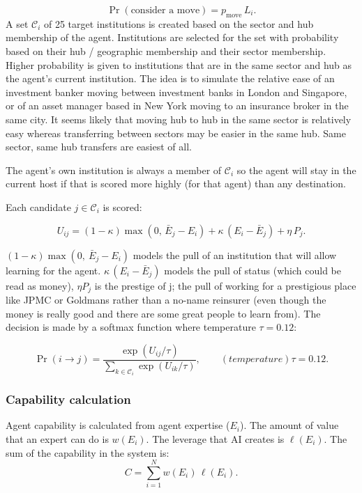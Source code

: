 \documentclass[11pt]{article}
\begin{document}
\begin{equation}\label{eq:E13}
  \Pr(\text{consider a move}) = p_{\text{move}}\, L_i .
\end{equation}
A set $\mathcal{C}_i$ of 25 target institutions is created based on the sector and hub membership of the agent. Institutions are selected for the set with probability based on their hub / geographic membership and their sector membership. Higher probability is given to institutions that are in the same sector and hub as the agent's current institution. The idea is to simulate the relative ease of an investment banker moving between investment banks in London and Singapore, or of an asset manager based in New York moving to an insurance broker in the same city. It seems likely that moving hub to hub in the same sector is relatively easy whereas transferring between sectors may be easier in the same hub. Same sector, same hub transfers are easiest of all. 

The agent's own institution is always a member of $\mathcal{C}_i$ so the agent will stay in the current host if that is scored more highly (for that agent) than any destination. 

Each candidate $j \in \mathcal{C}_i$ is scored:

\begin{equation}\label{eq:E14}
  U_{ij} = (1-\kappa)\max(0,\, \bar E_j - E_i)
         + \kappa\,(E_i - \bar E_j)
         + \eta\, P_j .
\end{equation}

$(1-\kappa)\max(0,\ \bar E_j - E_i)$ models the pull of an institution that will allow learning for the agent. $\kappa\,(E_i - \bar E_j)$ models the pull of status (which could be read as money),  $\eta P_j$ is the prestige of j; the pull of working for a prestigious place like JPMC or Goldmans rather than a no-name reinsurer (even though the money is really good and there are some great people to learn from). The decision is made by a softmax function where temperature $\tau = 0.12$:

\begin{equation}\label{eq:E15}
  \Pr(i \to j) = \frac{\exp(U_{ij}/\tau)}
                      {\sum_{k \in \mathcal{C}_i} \exp(U_{ik}/\tau)},
  \qquad (temperature) \tau = 0.12 .
\end{equation}
\subsubsection{Capability calculation}
Agent capability is calculated from agent expertise ($E_i$). The amount of value that an expert can do is $w(E_i)$. The leverage that AI creates is $\ell(E_i)$. The sum of the capability in the system is:
\begin{equation}\label{eq:capability}
  C = \sum_{i=1}^{N} w(E_i)\,\ell(E_i).
\end{equation}
\end{document}
